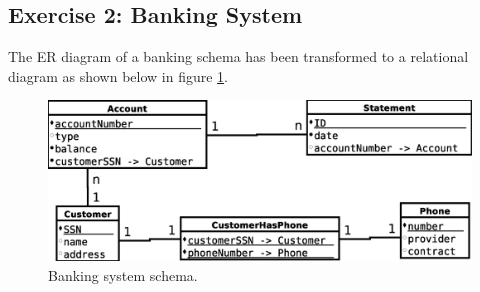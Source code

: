 \subsection{Exercise 2: Banking System}
The ER diagram of a banking schema has been transformed to a relational diagram as shown below in figure \ref{fig:ss3-ex2-schema}.

\begin{figure}[h]
  \centering
  \includegraphics[width=\linewidth]{3-12.03.14/exercise2.eps}
  \caption{Banking system schema.}\label{fig:ss3-ex2-schema}
\end{figure}
